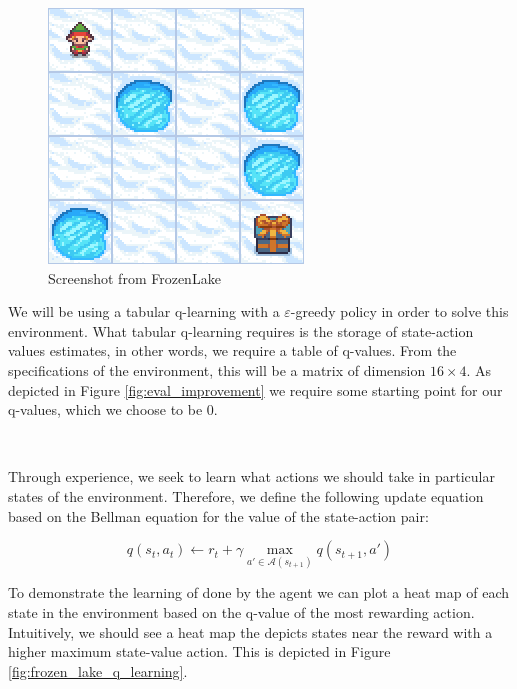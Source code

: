 \documentclass{article}
\begin{document}
\begin{figure}
	\centering
	\includegraphics[scale=0.5]{images/frozen_lake_frame.png}
	\caption{Screenshot from FrozenLake \citep{kwiatkowski2024gymnasium}}
	\label{fig:frozen_lake}
\end{figure}

We will be using a tabular q-learning with a $\varepsilon$-greedy policy in order to solve this environment. What tabular q-learning requires is the storage of state-action values estimates, in other words, we require a table of q-values. From the specifications of the environment, this will be a matrix of dimension $16 \times 4$. As depicted in Figure \ref{fig:eval_improvement} we require some starting point for our q-values, which we choose to be $0$.

\

Through experience, we seek to learn what actions we should take in particular states of the environment. Therefore, we define the following update equation based on the Bellman equation for the value of the state-action pair:

\begin{equation}\label{eq:q_update}
    q(s_t, a_t) \leftarrow r_t + \gamma  \max_{a' \in \mathcal{A}(s_{t+1})} q(s_{t+1}, a')
\end{equation}

To demonstrate the learning of done by the agent we can plot a heat map of each state in the environment based on the q-value of the most rewarding action. Intuitively, we should see a heat map the depicts states near the reward with a higher maximum  state-value action. This is depicted in Figure \ref{fig:frozen_lake_q_learning}.
\end{document}
